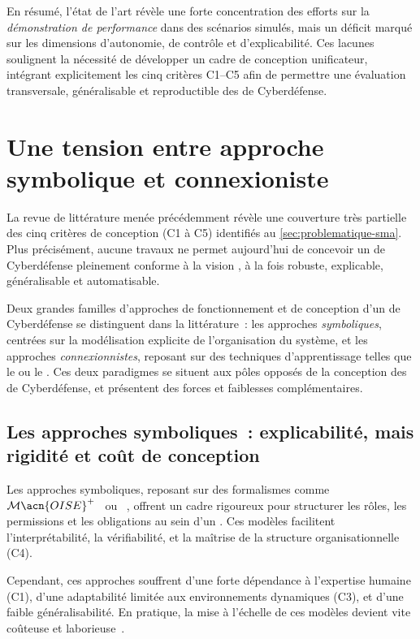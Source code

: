 \noindent
En résumé, l'état de l'art révèle une forte concentration des efforts sur la \emph{démonstration de performance} dans des scénarios simulés, mais un déficit marqué sur les dimensions d'autonomie, de contrôle et d'explicabilité. Ces lacunes soulignent la nécessité de développer un cadre de conception unificateur, intégrant explicitement les cinq critères C1--C5 afin de permettre une évaluation transversale, généralisable et reproductible des  de Cyberdéfense.



\section{Une tension entre approche symbolique et connexioniste}\label{sec:limits-existing}

La revue de littérature menée précédemment révèle une couverture très partielle des cinq critères de conception (C1 à C5) identifiés au \autoref{sec:problematique-sma}. Plus précisément, aucune travaux ne permet aujourd'hui de concevoir un  de Cyberdéfense pleinement conforme à la vision , à la fois robuste, explicable, généralisable et automatisable.

Deux grandes familles d'approches de fonctionnement et de conception d'un  de Cyberdéfense se distinguent dans la littérature~: les approches \textit{symboliques}, centrées sur la modélisation explicite de l'organisation du système, et les approches \textit{connexionnistes}, reposant sur des techniques d'apprentissage telles que le  ou le . Ces deux paradigmes se situent aux pôles opposés de la conception des  de Cyberdéfense, et présentent des forces et faiblesses complémentaires.

\subsection{Les approches symboliques~: explicabilité, mais rigidité et coût de conception}

Les approches symboliques, reposant sur des formalismes comme $\mathcal{M}\acn{OISE}^+$~\cite{hubner2002moise} ou ~\cite{Ferber2004}, offrent un cadre rigoureux pour structurer les rôles, les permissions et les obligations au sein d'un . Ces modèles facilitent l'interprétabilité, la vérifiabilité, et la maîtrise de la structure organisationnelle (C4).

Cependant, ces approches souffrent d'une forte dépendance à l'expertise humaine (C1), d'une adaptabilité limitée aux environnements dynamiques (C3), et d'une faible généralisabilité. En pratique, la mise à l'échelle de ces modèles devient vite coûteuse et laborieuse~\cite{Picard2006}.

